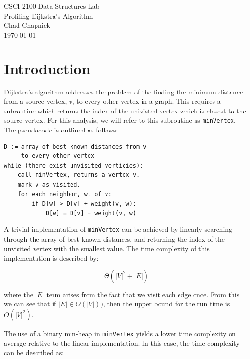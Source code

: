 \documentclass[technote]{IEEEtran}
\begin{document}
\begin{titlepage}
    \vspace*{\fill}
    \begin{center}
        {\Huge CSCI-2100 Data Structures Lab}\\[0.3cm]
        {\huge Profiling Dijkstra's Algorithm}\\[0.6cm]
        {\Large Chad Chapnick}\\[0.4cm]
        {\small\today}
    \end{center}
    \vspace*{\fill}
\end{titlepage}
\section{Introduction}

Dijkstra's algorithm addresses the problem of 
the finding the minimum distance from a source vertex, $v$, 
to every other vertex in a graph.
This requires a subroutine which returns 
the index of the univisted vertex which is closest to the source vertex.
For this analysis, we will refer to this subroutine as \texttt{minVertex}.
The pseudocode is outlined as follows:
\begin{lstlisting}
D := array of best known distances from v
     to every other vertex
while (there exist unvisited verticies):
    call minVertex, returns a vertex v.
    mark v as visited.
    for each neighbor, w, of v:
        if D[w] > D[v] + weight(v, w):
            D[w] = D[v] + weight(v, w)
\end{lstlisting}



A trivial implementation of \texttt{minVertex} can be achieved by linearly 
searching through the array of best known distances, and returning the 
index of the unvisited vertex with the smallest value. 
The time complexity of this implementation is described by:

$$\Theta(|V|^2 + |E|)$$

where the $|E|$ term arises from the fact that we visit each edge once.
From this we can see that if $|E| \in O(|V|))$, 
then the upper bound for the run time is $O(|V|^2)$.

The use of a binary min-heap in \texttt{minVertex} yields a 
lower time complexity on average relative to the linear implementation.
In this case, the time complexity can be described as:
\end{document}
